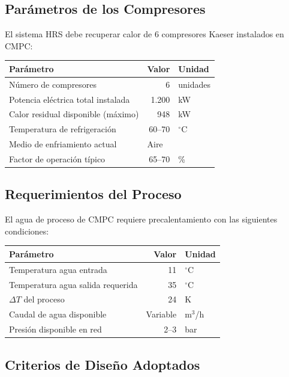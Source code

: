 \documentclass[12pt,a4paper]{article}
\begin{document}
\subsection{Parámetros de los Compresores}

El sistema HRS debe recuperar calor de 6 compresores Kaeser instalados en CMPC:

\begin{table}[h]
\centering
\begin{tabular}{lrl}
\toprule
\textbf{Parámetro} & \textbf{Valor} & \textbf{Unidad} \\
\midrule
Número de compresores & 6 & unidades \\
Potencia eléctrica total instalada & 1.200 & kW \\
Calor residual disponible (máximo) & 948 & kW \\
Temperatura de refrigeración & 60--70 & $^\circ$C \\
Medio de enfriamiento actual & \multicolumn{2}{l}{Aire} \\
Factor de operación típico & 65--70 & \% \\
\bottomrule
\end{tabular}
\end{table}

\subsection{Requerimientos del Proceso}

El agua de proceso de CMPC requiere precalentamiento con las siguientes condiciones:

\begin{table}[h]
\centering
\begin{tabular}{lrl}
\toprule
\textbf{Parámetro} & \textbf{Valor} & \textbf{Unidad} \\
\midrule
Temperatura agua entrada & 11 & $^\circ$C \\
Temperatura agua salida requerida & 35 & $^\circ$C \\
$\Delta T$ del proceso & 24 & K \\
Caudal de agua disponible & Variable & m$^3$/h \\
Presión disponible en red & 2--3 & bar \\
\bottomrule
\end{tabular}
\end{table}

\subsection{Criterios de Diseño Adoptados}
\end{document}
